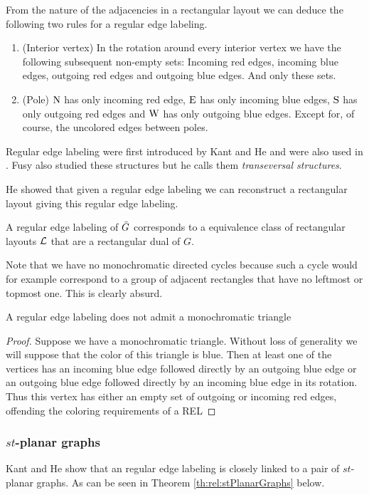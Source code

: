   From the nature of the adjacencies in a rectangular layout we can deduce the following two rules for a regular edge labeling.
  \begin{enumerate}
    \item (Interior vertex) In the rotation around every interior vertex we have the following subsequent non-empty sets: Incoming red edges, incoming blue edges, outgoing red edges and outgoing blue edges. And only these sets.
    \item (Pole) $\mathrm{N}$ has only incoming red edge, $\mathrm{E}$ has only incoming blue edges, $\mathrm{S}$ has only outgoing red edges and $\mathrm{W}$ has only outgoing blue edges. Except for, of course, the uncolored edges between poles.
  \end{enumerate}

  Regular edge labeling were first introduced by Kant and He \cite{Kant1997} and were also used in \cite{Eppstein2012}. Fusy also studied these structures \cite{Fusy2006,Fusy2009} but he calls them \emph{transeversal structures}.

  He showed \cite{He1993} that given a regular edge labeling we can reconstruct a rectangular layout giving this regular edge labeling.

  A regular edge labeling  of $\bar{G}$ corresponds to a equivalence class of rectangular layouts $\mathcal{L}$ that are a rectangular dual of $G$.

  Note that we have no monochromatic directed cycles because such a cycle would for example correspond to a  group of adjacent rectangles that have  no leftmost or topmost one. This is clearly absurd.

  \begin{lemma}
    \label{lm:rel:noMonoColoredTriangles}
    A regular edge labeling does not admit a monochromatic triangle
  \end{lemma}

  \begin{proof}
    Suppose we have a monochromatic triangle. Without loss of generality we will suppose that the color of this triangle is blue. Then at least one of the vertices has an incoming blue edge followed directly by an outgoing blue edge or an outgoing blue edge followed directly by an incoming blue edge in its rotation. Thus this vertex has either an empty set of outgoing or incoming red edges, offending the coloring requirements of a REL
  \end{proof}

  \subsubsection{$st$-planar graphs}
    Kant and He \cite[pp.179]{Kant1997} show that an regular edge labeling is closely linked to a pair of $st$-planar graphs. As can be seen in Theorem \ref{th:rel:stPlanarGraphs} below.


